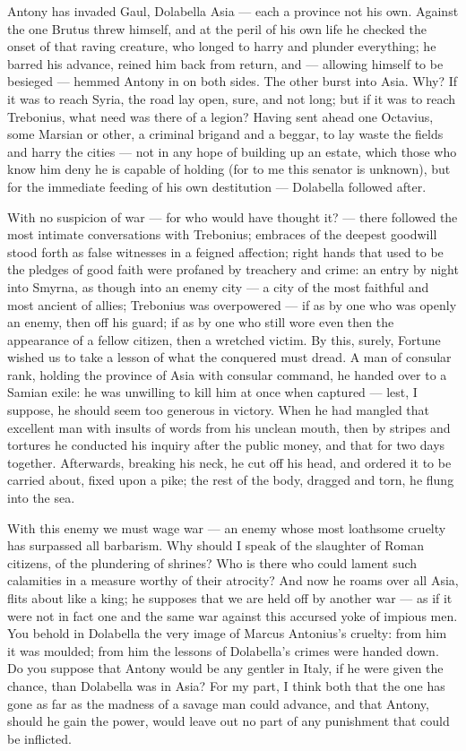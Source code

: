  Antony has invaded Gaul, Dolabella Asia --- each a province not his own. Against the one Brutus threw himself, and at the peril of his own life he checked the onset of that raving creature, who longed to harry and plunder everything; he barred his advance, reined him back from return, and --- allowing himself to be besieged --- hemmed Antony in on both sides. The other burst into Asia. Why? If it was to reach Syria, the road lay open, sure, and not long; but if it was to reach Trebonius, what need was there of a legion? Having sent ahead one Octavius, some Marsian or other, a criminal brigand and a beggar, to lay waste the fields and harry the cities --- not in any hope of building up an estate, which those who know him deny he is capable of holding (for to me this senator is unknown), but for the immediate feeding of his own destitution --- Dolabella followed after.

 With no suspicion of war --- for who would have thought it? --- there followed the most intimate conversations with Trebonius; embraces of the deepest goodwill stood forth as false witnesses in a feigned affection; right hands that used to be the pledges of good faith were profaned by treachery and crime: an entry by night into Smyrna, as though into an enemy city --- a city of the most faithful and most ancient of allies; Trebonius was overpowered --- if as by one who was openly an enemy, then off his guard; if as by one who still wore even then the appearance of a fellow citizen, then a wretched victim. By this, surely, Fortune wished us to take a lesson of what the conquered must dread. A man of consular rank, holding the province of Asia with consular command, he handed over to a Samian exile: he was unwilling to kill him at once when captured --- lest, I suppose, he should seem too generous in victory. When he had mangled that excellent man with insults of words from his unclean mouth, then by stripes and tortures he conducted his inquiry after the public money, and that for two days together. Afterwards, breaking his neck, he cut off his head, and ordered it to be carried about, fixed upon a pike; the rest of the body, dragged and torn, he flung into the sea.

 With this enemy we must wage war --- an enemy whose most loathsome cruelty has surpassed all barbarism. Why should I speak of the slaughter of Roman citizens, of the plundering of shrines? Who is there who could lament such calamities in a measure worthy of their atrocity? And now he roams over all Asia, flits about like a king; he supposes that we are held off by another war --- as if it were not in fact one and the same war against this accursed yoke of impious men. You behold in Dolabella the very image of Marcus Antonius's cruelty: from him it was moulded; from him the lessons of Dolabella's crimes were handed down. Do you suppose that Antony would be any gentler in Italy, if he were given the chance, than Dolabella was in Asia? For my part, I think both that the one has gone as far as the madness of a savage man could advance, and that Antony, should he gain the power, would leave out no part of any punishment that could be inflicted.

